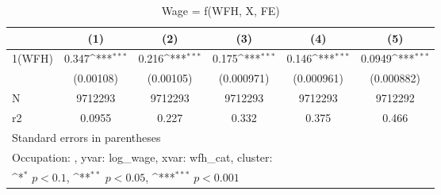 \begin{table}[htbp]\centering
\def\sym#1{\ifmmode^{#1}\else\(^{#1}\)\fi}
\caption{Wage = f(WFH, X, FE)}
\begin{tabular}{l*{5}{c}}
\hline\hline
                    &\multicolumn{1}{c}{(1)}         &\multicolumn{1}{c}{(2)}         &\multicolumn{1}{c}{(3)}         &\multicolumn{1}{c}{(4)}         &\multicolumn{1}{c}{(5)}         \\
\hline
1(WFH)              &       0.347\sym{***}&       0.216\sym{***}&       0.175\sym{***}&       0.146\sym{***}&      0.0949\sym{***}\\
                    &   (0.00108)         &   (0.00105)         &  (0.000971)         &  (0.000961)         &  (0.000882)         \\
\hline
N                   &     9712293         &     9712293         &     9712293         &     9712293         &     9712292         \\
r2                  &      0.0955         &       0.227         &       0.332         &       0.375         &       0.466         \\
\hline\hline
\multicolumn{6}{l}{\footnotesize Standard errors in parentheses}\\
\multicolumn{6}{l}{\footnotesize Occupation: , yvar: log\_wage, xvar: wfh\_cat, cluster: }\\
\multicolumn{6}{l}{\footnotesize \sym{*} \(p<0.1\), \sym{**} \(p<0.05\), \sym{***} \(p<0.001\)}\\
\end{tabular}
\end{table}
